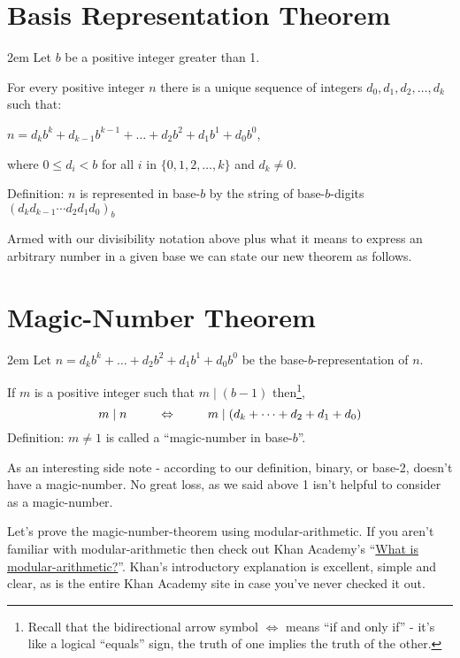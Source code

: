 \documentclass{article}
\newenvironment{jprIn}{\begin{adjustwidth}{2em}{}}{\end{adjustwidth}}
\begin{document}
\section*{Basis Representation Theorem}
\begin{jprIn}
Let $b$ be a positive integer greater than 1.

For every positive integer $n$ there is a unique sequence
of integers $d_0, d_1, d_2,\dots{},d_k$ such that:

\hspace{3em}$n=d_kb^k+d_{k-1}b^{k-1}+\dots+d_2b^2+d_1b^1+d_0b^0$,

where $0\le{}d_i<b$ for all $i$ in $\{0,1,2,\dots{},k\}$ and $d_k\ne0$.

Definition: $n$ is represented in base-$b$ by the string
of base-$b$-digits $(d_kd_{k-1}{\cdots}d_2d_1d_0)_b$
\end{jprIn}

\bigskip
Armed with our divisibility notation above plus what it means to
express an arbitrary number in a given base we can state our new theorem as follows.
\section*{Magic-Number Theorem}
\begin{jprIn}
Let
$n=d_kb^k+\dots+d_2b^2+d_1b^1+d_0b^0$
be the base-$b$-representation of $n$.

If $m$ is a positive integer such that $m\mid{}(b-1)$ then\footnote{Recall that the 
bidirectional arrow symbol $\Leftrightarrow$
means ``if and only if'' - it's like a logical ``equals'' sign, the truth of one implies the truth
of the other.},
\[m\mid{}n \text{\hspace{2.5em}} \Leftrightarrow \text{\hspace{2.5em}}m\mid{}(d_k+\dots+d_2+d_1+d_0)\]
Definition: $m\ne1$ is called a ``magic-number in base-$b$''.
\end{jprIn}
\bigskip

As an interesting side note - according to our definition, binary,
or base-2, doesn't have a magic-number.
No great loss, as we said above 1 isn't helpful to consider as a magic-number. 

Let's prove the magic-number-theorem using 
modular-arithmetic. If you aren't familiar with modular-arithmetic
then check out Khan Academy's
``\href{https://www.khanacademy.org/computing/computer-science/cryptography/modarithmetic/a/what-is-modular-arithmetic}{What is modular-arithmetic?}''.
Khan's introductory explanation is excellent, simple and clear,
as is the entire Khan Academy site in case you've never checked it out.
\end{document}
